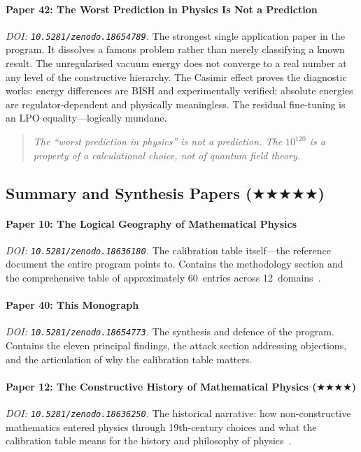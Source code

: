 \documentclass[11pt,a4paper]{report}
\theoremstyle{plain}
\theoremstyle{definition}
\theoremstyle{remark}
\newcommand{\BISH}{\mathrm{BISH}}
\newcommand{\LPO}{\mathrm{LPO}}
\newcommand{\FiveStar}{$\bigstar\bigstar\bigstar\bigstar\bigstar$}
\newcommand{\FourStar}{$\bigstar\bigstar\bigstar\bigstar$}
\begin{document}
\paragraph{Paper 42: The Worst Prediction in Physics Is Not a Prediction}
\emph{DOI: \texttt{10.5281/zenodo.18654789}.}\quad
The strongest single application paper in the program.  It dissolves a famous problem rather than merely classifying a known result.  The unregularised vacuum energy does not converge to a real number at any level of the constructive hierarchy.  The Casimir effect proves the diagnostic works: energy differences are $\BISH$ and experimentally verified; absolute energies are regulator-dependent and physically meaningless.  The residual fine-tuning is an $\LPO$ equality---logically mundane.
\begin{quote}\itshape
The ``worst prediction in physics'' is not a prediction.  The $10^{120}$ is a property of a calculational choice, not of quantum field theory.
\end{quote}

\subsection{Summary and Synthesis Papers {\normalfont(\FiveStar)}}

\paragraph{Paper 10: The Logical Geography of Mathematical Physics}
\emph{DOI: \texttt{10.5281/zenodo.18636180}.}\quad
The calibration table itself---the reference document the entire program points to.  Contains the methodology section and the comprehensive table of approximately 60~entries across 12~domains~\cite{Lee2026P10}.

\paragraph{Paper 40: This Monograph}
\emph{DOI: \texttt{10.5281/zenodo.18654773}.}\quad
The synthesis and defence of the program.  Contains the eleven principal findings, the attack section addressing objections, and the articulation of why the calibration table matters.

\paragraph{Paper 12: The Constructive History of Mathematical Physics {\normalfont(\FourStar)}}
\emph{DOI: \texttt{10.5281/zenodo.18636250}.}\quad
The historical narrative: how non-constructive mathematics entered physics through 19th-century choices and what the calibration table means for the history and philosophy of physics~\cite{Lee2026P12}.
\end{document}

